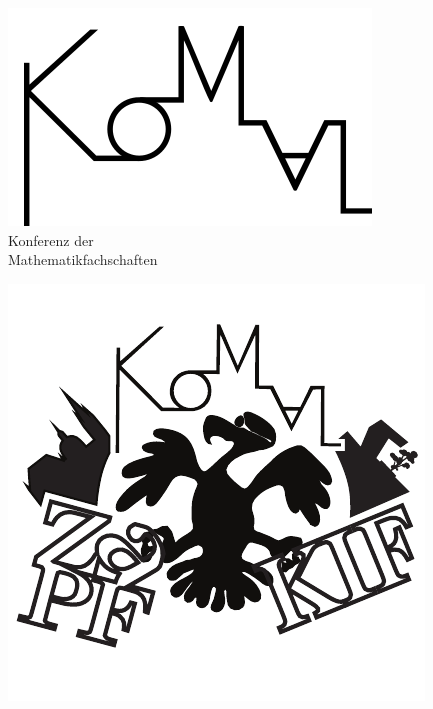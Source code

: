 \documentclass[DIV=calc]{scrartcl}
\begin{document}
\begin{adjustbox}{center}
\begin{minipage}{1.2\textwidth}
	\begin{minipage}{4cm}
		\vspace{-1.4cm}
		\includegraphics[width=\textwidth]{komaLogo.png}\\
		\centering
		\small Konferenz der \\ Mathematikfachschaften
	\end{minipage}
	\hfill
	\begin{minipage}[c]{0.25\textwidth}
		\vspace{-2cm}
		\includegraphics[width=\textwidth]{zkk_logo.pdf}

\end{minipage}
\end{minipage}
\end{adjustbox}
\end{document}
